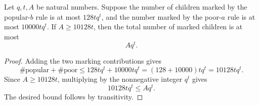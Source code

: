 \begin{helper}
Let \(q,t,A\) be natural numbers.  Suppose the number of children marked by
the popular-\(b\) rule is at most \(128tq^t\), and the number marked by the
poor-\(a\) rule is at most \(10000tq^t\).  If \(A\ge10128t\), then the total
number of marked children is at most
\[
  Aq^t.
\]
\end{helper}
\begin{proof}
Adding the two marking contributions gives
\[
  \#\mathrm{popular}+\#\mathrm{poor}
  \le128tq^t+10000tq^t
  =(128+10000)tq^t
  =10128tq^t.
\]
Since \(A\ge10128t\), multiplying by the nonnegative integer \(q^t\) gives
\[
  10128tq^t\le Aq^t.
\]
The desired bound follows by transitivity.
\end{proof}
